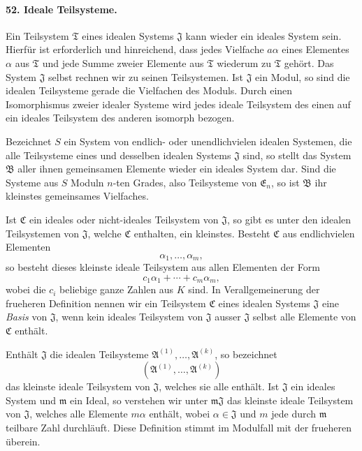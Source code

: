 \documentclass[11pt]{article}
\begin{document}
\paragraph{52. Ideale Teilsysteme.}
Ein Teilsystem $\mathfrak T$ eines idealen Systems $\mathfrak J$ kann wieder ein ideales System sein. Hierfür ist erforderlich und hinreichend, dass jedes Vielfache $a\alpha$ eines Elementes $\alpha$ aus $\mathfrak T$ und jede Summe zweier Elemente aus $\mathfrak T$ wiederum zu $\mathfrak T$ gehört. Das System $\mathfrak J$ selbst rechnen wir zu seinen Teilsystemen. Ist $\mathfrak J$ ein Modul, so sind die idealen Teilsysteme gerade die Vielfachen des Moduls. Durch einen Isomorphismus zweier idealer Systeme wird jedes ideale Teilsystem des einen auf ein ideales Teilsystem des anderen isomorph bezogen.

Bezeichnet $S$ ein System von endlich- oder unendlichvielen idealen Systemen, die alle Teilsysteme eines und desselben idealen Systems $\mathfrak J$ sind, so stellt das System $\mathfrak B$ aller ihnen gemeinsamen Elemente wieder ein ideales System dar. Sind die Systeme aus $S$ Moduln $n$-ten Grades, also Teilsysteme von $\mathfrak E_n$, so ist $\mathfrak B$ ihr kleinstes gemeinsames Vielfaches.

Ist $\mathfrak C$ ein ideales oder nicht-ideales Teilsystem von $\mathfrak J$, so gibt es unter den idealen Teilsystemen von $\mathfrak J$, welche $\mathfrak C$ enthalten, ein kleinstes. Besteht $\mathfrak C$ aus endlichvielen Elementen
\[
  \alpha_1,\ldots,\alpha_m,
\]
so besteht dieses kleinste ideale Teilsystem aus allen Elementen der Form
\begin{equation}
  c_1\alpha_1+\cdots+c_m\alpha_m,
\tag{87}
\end{equation}
wobei die $c_i$ beliebige ganze Zahlen aus $K$ sind. In Verallgemeinerung der frueheren Definition nennen wir ein Teilsystem $\mathfrak C$ eines idealen Systems $\mathfrak J$ eine \emph{Basis} von $\mathfrak J$, wenn kein ideales Teilsystem von $\mathfrak J$ ausser $\mathfrak J$ selbst alle Elemente von $\mathfrak C$ enthält.

Enthält $\mathfrak J$ die idealen Teilsysteme $\mathfrak A^{(1)},\ldots,\mathfrak A^{(k)}$, so bezeichnet
\[
  (\mathfrak A^{(1)},\ldots,\mathfrak A^{(k)})
\]
das kleinste ideale Teilsystem von $\mathfrak J$, welches sie alle enthält. Ist $\mathfrak J$ ein ideales System und $\mathfrak m$ ein Ideal, so verstehen wir unter $\mathfrak m\mathfrak J$ das kleinste ideale Teilsystem von $\mathfrak J$, welches alle Elemente $m\alpha$ enthält, wobei $\alpha\in\mathfrak J$ und $m$ jede durch $\mathfrak m$ teilbare Zahl durchläuft. Diese Definition stimmt im Modulfall mit der frueheren überein.
\end{document}
